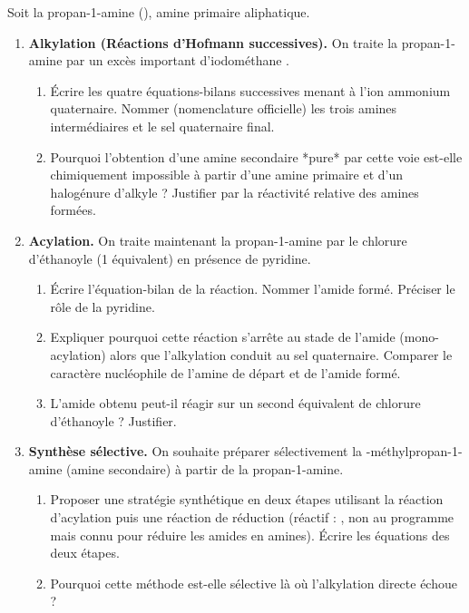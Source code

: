 \documentclass[11pt]{article}
\begin{document}
\begin{exercice}
Soit la propan-1-amine (), amine primaire aliphatique.
\begin{enumerate}
    \item \textbf{Alkylation (Réactions d'Hofmann successives).} On traite la propan-1-amine par un excès important d'iodométhane .
    \begin{enumerate}
        \item Écrire les quatre équations-bilans successives menant à l'ion ammonium quaternaire. Nommer (nomenclature officielle) les trois amines intermédiaires et le sel quaternaire final.
        \item Pourquoi l'obtention d'une amine secondaire *pure* par cette voie est-elle chimiquement impossible à partir d'une amine primaire et d'un halogénure d'alkyle ? Justifier par la réactivité relative des amines formées.
    \end{enumerate}
    \item \textbf{Acylation.} On traite maintenant la propan-1-amine par le chlorure d'éthanoyle  (1 équivalent) en présence de pyridine.
    \begin{enumerate}
        \item Écrire l'équation-bilan de la réaction. Nommer l'amide formé. Préciser le rôle de la pyridine.
        \item Expliquer pourquoi cette réaction s'arrête au stade de l'amide (mono-acylation) alors que l'alkylation conduit au sel quaternaire. Comparer le caractère nucléophile de l'amine de départ et de l'amide formé.
        \item L'amide obtenu peut-il réagir sur un second équivalent de chlorure d'éthanoyle ? Justifier.
    \end{enumerate}
    \item \textbf{Synthèse sélective.} On souhaite préparer sélectivement la -méthylpropan-1-amine (amine secondaire) à partir de la propan-1-amine.
    \begin{enumerate}
        \item Proposer une stratégie synthétique en deux étapes utilisant la réaction d'acylation puis une réaction de réduction (réactif : , non au programme mais connu pour réduire les amides en amines). Écrire les équations des deux étapes.
        \item Pourquoi cette méthode est-elle sélective là où l'alkylation directe échoue ?
    \end{enumerate}
\end{enumerate}
\end{exercice}
\end{document}
